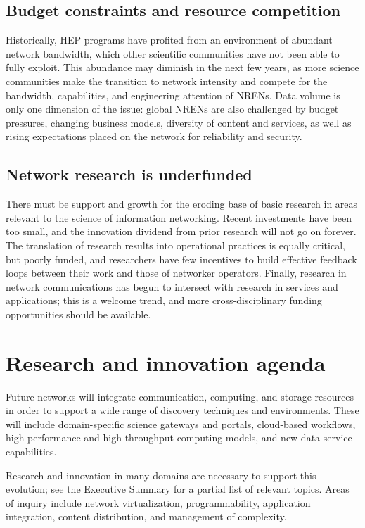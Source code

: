 \subsection{Budget constraints and resource competition}

Historically, HEP programs have profited from an environment of abundant network bandwidth, which other scientific communities have not been able to fully exploit. This abundance may diminish in the next few years, as more science communities make the transition to network intensity and compete for the bandwidth, capabilities, and engineering attention of NRENs. Data volume is only one dimension of the issue: global NRENs are also challenged by budget pressures, changing business models, diversity of content and services, as well as rising expectations placed on the network for reliability and security.

\subsection{Network research is underfunded}

There must be support and growth for the eroding base of basic research in areas relevant to the science of information networking. Recent investments have been too small, and the innovation dividend from prior research will not go on forever.  The translation of research results into operational practices is equally critical, but poorly funded, and researchers have few incentives to build effective feedback loops between their work and those of networker operators. Finally, research in network communications has begun to intersect with research in services and applications; this is a welcome trend, and more cross-disciplinary funding opportunities should be available.  

\section{Research and innovation agenda}

Future networks will integrate communication, computing, and storage resources in order to support a wide range of discovery techniques and environments. These will include domain-specific science gateways and portals, cloud-based workflows, high-performance and high-throughput computing models, and new data service capabilities.

Research and innovation in many domains are necessary to support this evolution; see the Executive Summary for a partial list of relevant topics.  Areas of inquiry include network virtualization, programmability, application integration, content distribution, and management of complexity.

